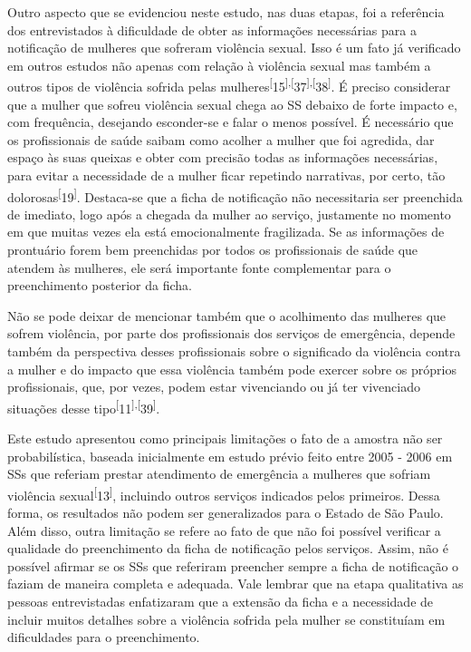 \documentclass{article}
\begin{document}
Outro aspecto que se evidenciou neste estudo, nas duas etapas, foi a referência
dos entrevistados à dificuldade de obter as informações necessárias para a
notificação de mulheres que sofreram violência sexual. Isso é um fato já
verificado em outros estudos não apenas com relação à violência sexual mas
também a outros tipos de violência sofrida pelas
mulheres\textsuperscript{[}15\textsuperscript{]}\textsuperscript{,}\textsuperscript{[}37\textsuperscript{]}\textsuperscript{,}\textsuperscript{[}38\textsuperscript{]}. É preciso considerar que a mulher que sofreu violência sexual chega ao SS
debaixo de forte impacto e, com frequência, desejando esconder-se e falar o
menos possível. É necessário que os profissionais de saúde saibam como acolher a
mulher que foi agredida, dar espaço às suas queixas e obter com precisão todas
as informações necessárias, para evitar a necessidade de a mulher ficar
repetindo narrativas, por certo, tão
dolorosas\textsuperscript{[}19\textsuperscript{]}. Destaca-se que a ficha de notificação não necessitaria ser preenchida de
imediato, logo após a chegada da mulher ao serviço, justamente no momento em que
muitas vezes ela está emocionalmente fragilizada. Se as informações de
prontuário forem bem preenchidas por todos os profissionais de saúde que atendem
às mulheres, ele será importante fonte complementar para o preenchimento
posterior da ficha.

Não se pode deixar de mencionar também que o acolhimento das mulheres que sofrem
violência, por parte dos profissionais dos serviços de emergência, depende
também da perspectiva desses profissionais sobre o significado da violência
contra a mulher e do impacto que essa violência também pode exercer sobre os
próprios profissionais, que, por vezes, podem estar vivenciando ou já ter
vivenciado situações desse tipo\textsuperscript{[}11\textsuperscript{]}\textsuperscript{,}\textsuperscript{[}39\textsuperscript{]}.

Este estudo apresentou como principais limitações o fato de a amostra não ser
probabilística, baseada inicialmente em estudo prévio feito entre 2005 - 2006 em
SSs que referiam prestar atendimento de emergência a mulheres que sofriam
violência sexual\textsuperscript{[}13\textsuperscript{]}, incluindo outros serviços indicados pelos primeiros. Dessa forma, os
resultados não podem ser generalizados para o Estado de São Paulo. Além disso,
outra limitação se refere ao fato de que não foi possível verificar a qualidade
do preenchimento da ficha de notificação pelos serviços. Assim, não é possível
afirmar se os SSs que referiram preencher sempre a ficha de notificação o faziam
de maneira completa e adequada. Vale lembrar que na etapa qualitativa as pessoas
entrevistadas enfatizaram que a extensão da ficha e a necessidade de incluir
muitos detalhes sobre a violência sofrida pela mulher se constituíam em
dificuldades para o preenchimento.
\end{document}
